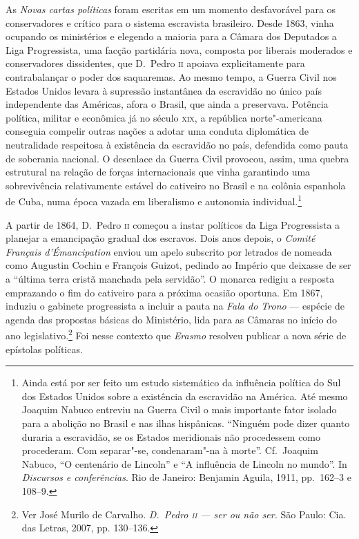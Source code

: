As \textit{Novas cartas políticas} foram escritas em um momento
desfavorável para os conservadores e crítico para o sistema escravista
brasileiro. Desde 1863, vinha ocupando os ministérios e elegendo a maioria 
para a Câmara dos Deputados a Liga Progressista, uma facção partidária nova, 
composta por liberais moderados e conservadores dissidentes, que D.~Pedro \textsc{ii} 
apoiava explicitamente para contrabalançar o poder dos saquaremas.
Ao mesmo tempo, a Guerra Civil
nos Estados Unidos levara à  supressão instantânea da escravidão no
único país independente das Américas, afora o Brasil, que ainda a
preservava. Potência política, militar e econômica já no século \textsc{xix}, a
república norte"-americana conseguia compelir outras nações a adotar
uma conduta diplomática de neutralidade respeitosa à  existência da
escravidão no país, defendida como pauta de soberania nacional. O
desenlace da Guerra Civil provocou, assim, uma quebra estrutural na
relação de forças internacionais que vinha garantindo uma sobrevivência
relativamente estável do cativeiro no Brasil e na colônia espanhola de
Cuba, numa época vazada em liberalismo e autonomia
individual.\footnote{ Ainda está por ser feito um estudo sistemático da
influência política do Sul dos Estados Unidos sobre a existência da
escravidão na América. Até mesmo Joaquim Nabuco entreviu na Guerra
Civil o mais importante fator isolado para a abolição no Brasil e nas
ilhas hispânicas. ``Ninguém pode dizer quanto duraria a escravidão, se
os Estados meridionais não procedessem como procederam. Com
separar"-se, condenaram"-na à  morte''. Cf.~Joaquim Nabuco, ``O
centenário de Lincoln'' e ``A influência de Lincoln no mundo''. In
\textit{Discursos e conferências}. Rio de Janeiro: Benjamin
Aguila, 1911, pp.~162--3 e 108--9.} 

A partir de 1864, D.~Pedro \textsc{ii} começou a instar políticos da Liga
Progressista a planejar a emancipação gradual dos escravos. Dois anos
depois, o \textit{Comité Français d'Émancipation} enviou um apelo
subscrito por letrados de nomeada como Augustin Cochin e François
Guizot, pedindo ao Império que deixasse de ser a ``última terra cristã
manchada pela servidão''. O monarca redigiu a resposta emprazando o fim
do cativeiro para a próxima ocasião oportuna. Em 1867, induziu o
gabinete progressista a incluir a pauta na \textit{Fala do Trono} ---
espécie de agenda das propostas básicas do Ministério, lida para as
Câmaras no início do ano legislativo.\footnote{ Ver José Murilo de Carvalho. 
\textit{D.~Pedro \textsc{ii} --- ser ou não ser.} São Paulo: Cia. das Letras, 2007, pp. 130--136.} Foi
nesse contexto que \textit{Erasmo} resolveu publicar a nova série de epístolas políticas. 

